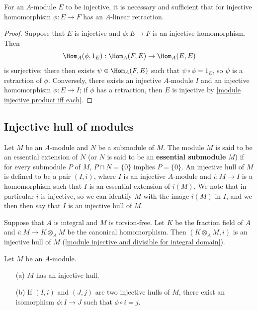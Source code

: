 \begin{corollary}\label{module injective iff homo has retracton}
For an $A$-module $E$ to be injective, it is necessary and sufficient that for injective homomorphism $\phi:E\to F$ has an $A$-linear retraction.
\end{corollary}
\begin{proof}
Suppose that $E$ is injective and $\phi:E\to F$ is an injective homomorphism. Then
\[\Hom_A(\phi,1_E):\Hom_A(F,E)\to\Hom_A(E,E)\]
is surjective; there then exists $\psi\in\Hom_A(F,E)$ such that $\psi\circ\phi=1_E$, so $\psi$ is a retraction of $\phi$. Conversely, there exists an injective $A$-module $I$ and an injective homomorphism $\phi:E\to I$; if $\phi$ has a retraction, then $E$ is injective by \cref{module injective product iff each}.
\end{proof}
\subsection{Injective hull of modules}
Let $M$ be an $A$-module and $N$ be a submodule of $M$. The module $M$ is said to be an essential extension of $N$ (or $N$ is said to be an \textbf{essential submodule} $M$) if for every submodule $P$ of $M$, $P\cap N=\{0\}$ implies $P=\{0\}$. An injective hull of $M$ is defined to be a pair $(I,i)$, where $I$ is an injective $A$-module and $i:M\to I$ is a homomorphism such that $I$ is an essential extension of $i(M)$. We note that in particular $i$ is injective, so we can identify $M$ with the image $i(M)$ in $I$, and we then then say that $I$ is an injective hull of $M$.
\begin{example}
Suppose that $A$ is integral and $M$ is torsion-free. Let $K$ be the fraction field of $A$ and $i:M\to K\otimes_AM$ be the canonical homomorphism. Then $(K\otimes_AM,i)$ is an injective hull of $M$ (\cref{module injective and divisible for integral domain}).
\end{example}
\begin{theorem}\label{module injective hull exist}
Let $M$ be an $A$-module.
\begin{itemize}
\item[(a)] $M$ has an injective hull.
\item[(b)] If $(I,i)$ and $(J,j)$ are two injective hulls of $M$, there exist an isomorphism $\phi:I\to J$ such that $\phi\circ i=j$.
\end{itemize}
\end{theorem}
